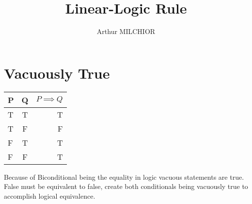 \documentclass[12pt]{article}
\title{Linear-Logic Rule}
\author{Arthur MILCHIOR}
\theoremstyle{definition}
\begin{document}
\section{Vacuously True}

\begin{tabular}{ l | c | r }
    P & Q & $P \implies Q$ \\
    \hline			
    T & T & T \\ \hline
    T & F & F \\ \hline
    F & T & \color{red}T \\ \hline
    F & F & \color{red}T \\
    \hline  
  \end{tabular}

  Because of Biconditional being the equality in logic vacuous statements are true. False must be equivalent to false, create both conditionals being vacuously true to accomplish logical equivalence.
\end{document}
